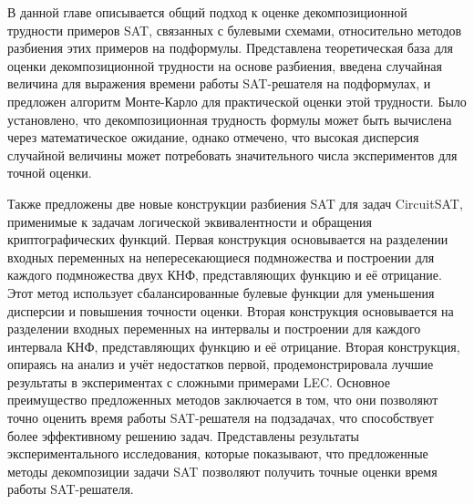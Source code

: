 \chapterconclusion

В данной главе описывается общий подход к оценке декомпозиционной трудности примеров SAT, связанных с булевыми схемами, относительно методов разбиения этих примеров на подформулы.
Представлена теоретическая база для оценки декомпозиционной трудности на основе разбиения, введена случайная величина для выражения времени работы SAT-решателя на подформулах, и предложен алгоритм Монте-Карло для практической оценки этой трудности.
Было установлено, что декомпозиционная трудность формулы может быть вычислена через математическое ожидание, однако отмечено, что высокая дисперсия случайной величины может потребовать значительного числа экспериментов для точной оценки.

Также предложены две новые конструкции разбиения SAT для задач CircuitSAT, применимые к задачам логической эквивалентности и обращения криптографических функций.
Первая конструкция основывается на разделении входных переменных на непересекающиеся подмножества и построении для каждого подмножества двух КНФ, представляющих функцию и её отрицание.
Этот метод использует сбалансированные булевые функции для уменьшения дисперсии и повышения точности оценки.
Вторая конструкция основывается на разделении входных переменных на интервалы и построении для каждого интервала КНФ, представляющих функцию и её отрицание.
Вторая конструкция, опираясь на анализ и учёт недостатков первой, продемонстрировала лучшие результаты в экспериментах с сложными примерами LEC.
Основное преимущество предложенных методов заключается в том, что они позволяют точно оценить время работы SAT-решателя на подзадачах, что способствует более эффективному решению задач.
Представлены результаты экспериментального исследования, которые показывают, что предложенные методы декомпозиции задачи SAT позволяют получить точные оценки время работы SAT-решателя.
